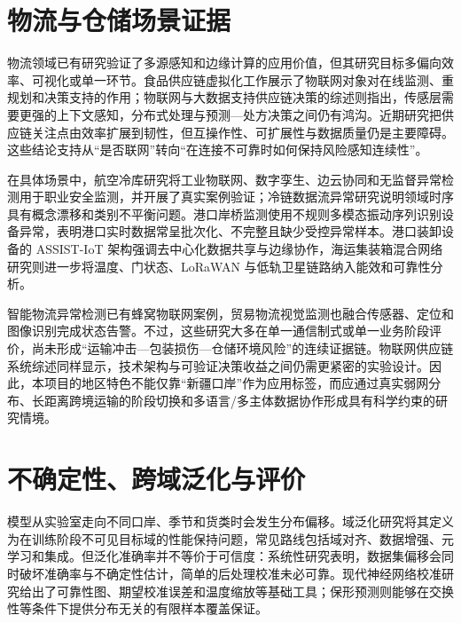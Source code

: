 \documentclass[UTF8,12pt,a4paper]{ctexart}
\begin{document}
\section{物流与仓储场景证据}

物流领域已有研究验证了多源感知和边缘计算的应用价值，但其研究目标多偏向效率、可视化或单一环节。食品供应链虚拟化工作展示了物联网对象对在线监测、重规划和决策支持的作用\cite{virtualizationoffood2016}；物联网与大数据支持供应链决策的综述则指出，传感层需要更强的上下文感知，分布式处理与预测—处方决策之间仍有鸿沟\cite{asystematicliterature2021}。近期研究把供应链关注点由效率扩展到韧性，但互操作性、可扩展性与数据质量仍是主要障碍\cite{enhancingsupplychain2024}。这些结论支持从“是否联网”转向“在连接不可靠时如何保持风险感知连续性”。

在具体场景中，航空冷库研究将工业物联网、数字孪生、边云协同和无监督异常检测用于职业安全监测，并开展了真实案例验证\cite{industrialinternetof2022}；冷链数据流异常研究说明领域时序具有概念漂移和类别不平衡问题\cite{ananomalydetection2025}。港口岸桥监测使用不规则多模态振动序列识别设备异常，表明港口实时数据常呈批次化、不完整且缺少受控异常样本\cite{unsupervisedconstraineddiscord2024}。港口装卸设备的 ASSIST-IoT 架构强调去中心化数据共享与边缘协作\cite{maritimeterminalscargo2023}，海运集装箱混合网络研究则进一步将温度、门状态、LoRaWAN 与低轨卫星链路纳入能效和可靠性分析\cite{hybridiotnetwork2025}。

智能物流异常检测已有蜂窝物联网案例\cite{deeplearninganomaly2021}，贸易物流视觉监测也融合传感器、定位和图像识别完成状态告警\cite{intelligentmonitoringand2024}。不过，这些研究大多在单一通信制式或单一业务阶段评价，尚未形成“运输冲击—包装损伤—仓储环境风险”的连续证据链。物联网供应链系统综述同样显示，技术架构与可验证决策收益之间仍需更紧密的实验设计\cite{iotbasedsupply2023}。因此，本项目的地区特色不能仅靠“新疆口岸”作为应用标签，而应通过真实弱网分布、长距离跨境运输的阶段切换和多语言/多主体数据协作形成具有科学约束的研究情境。

\section{不确定性、跨域泛化与评价}

模型从实验室走向不同口岸、季节和货类时会发生分布偏移。域泛化研究将其定义为在训练阶段不可见目标域的性能保持问题，常见路线包括域对齐、数据增强、元学习和集成\cite{domaingeneralizationa2022}。但泛化准确率并不等价于可信度：系统性研究表明，数据集偏移会同时破坏准确率与不确定性估计，简单的后处理校准未必可靠\cite{canyoutrust2019}。现代神经网络校准研究给出了可靠性图、期望校准误差和温度缩放等基础工具\cite{oncalibrationof2017}；保形预测则能够在交换性等条件下提供分布无关的有限样本覆盖保证\cite{agentleintroduction2021}。
\end{document}
